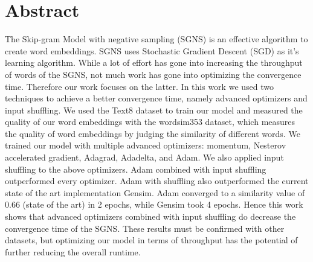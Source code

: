 \chapter*{Abstract}
The Skip-gram Model with negative sampling (SGNS) is an effective algorithm to create word embeddings. SGNS  uses Stochastic Gradient Descent (SGD) as it's learning algorithm. While a lot of effort has gone into increasing the throughput of words of the SGNS, not much work has gone into optimizing the convergence time. Therefore our work focuses on the latter. In this work we used two techniques to achieve a better convergence time, namely advanced optimizers and input shuffling. We used the Text8 dataset to train our model and measured the quality of our word embeddings with the wordsim353 dataset, which measures the quality of word embeddings by judging the similarity of different words. We trained our model with multiple advanced optimizers: momentum, Nesterov accelerated gradient, Adagrad, Adadelta, and Adam. We also applied input shuffling to the above optimizers. Adam combined with input shuffling outperformed every optimizer. Adam with shuffling also outperformed the current state of the art implementation Gensim. Adam converged to a similarity value of 0.66 (state of the art) in 2 epochs, while Gensim took 4 epochs. Hence this work shows that advanced optimizers combined with input shuffling do decrease the convergence time of the SGNS. These results must be confirmed with other datasets, but optimizing our model in terms of throughput  has the potential of further reducing the overall runtime.

